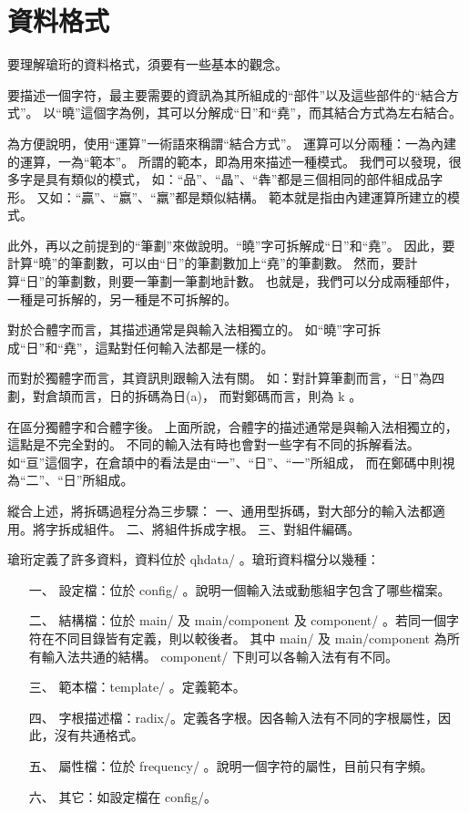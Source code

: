 ﻿\chapter{資料格式}

要理解瑲珩的資料格式，須要有一些基本的觀念。

要描述一個字符，最主要需要的資訊為其所組成的``部件''以及這些部件的``結合方式''。
以``曉''這個字為例，其可以分解成``日''和``堯''，而其結合方式為左右結合。

為方便說明，使用``運算''一術語來稱謂``結合方式''。
運算可以分兩種：一為內建的運算，一為``範本''。
所謂的範本，即為用來描述一種模式。
我們可以發現，很多字是具有類似的模式，
如：``品''、``晶''、``犇''都是三個相同的部件組成品字形。
又如：``贏''、``嬴''、``羸''都是類似結構。
範本就是指由內建運算所建立的模式。


此外，再以之前提到的``筆劃''來做說明。``曉''字可拆解成``日''和``堯''。
因此，要計算``曉''的筆劃數，可以由``日''的筆劃數加上``堯''的筆劃數。
然而，要計算``日''的筆劃數，則要一筆劃一筆劃地計數。
也就是，我們可以分成兩種部件，一種是可拆解的，另一種是不可拆解的。

對於合體字而言，其描述通常是與輸入法相獨立的。
如``曉''字可拆成``日''和``堯''，這點對任何輸入法都是一樣的。

而對於獨體字而言，其資訊則跟輸入法有關。
如：對計算筆劃而言，``日''為四劃，對倉頡而言，日的拆碼為日(a)，
而對鄭碼而言，則為 k 。

在區分獨體字和合體字後。
上面所說，合體字的描述通常是與輸入法相獨立的，這點是不完全對的。
不同的輸入法有時也會對一些字有不同的拆解看法。
如``亘''這個字，在倉頡中的看法是由``一''、``日''、``一''所組成，
而在鄭碼中則視為``二''、``日''所組成。

縱合上述，將拆碼過程分為三步驟：
一、通用型拆碼，對大部分的輸入法都適用。將字拆成組件。
二、將組件拆成字根。
三、對組件編碼。



瑲珩定義了許多資料，資料位於 qhdata/ 。瑲珩資料檔分以幾種：
\begin{enumerate}
\item[一、]設定檔：位於 config/ 。說明一個輸入法或動態組字包含了哪些檔案。
\item[二、]結構檔：位於 main/ 及 main/component 及 component/ 。若同一個字符在不同目錄皆有定義，則以較後者。
其中 main/ 及 main/component 為所有輸入法共通的結構。 component/ 下則可以各輸入法有有不同。
\item[三、]範本檔：template/ 。定義範本。
\item[四、]字根描述檔：radix/。定義各字根。因各輸入法有不同的字根屬性，因此，沒有共通格式。
\item[五、]屬性檔：位於 frequency/ 。說明一個字符的屬性，目前只有字頻。
\item[六、]其它：如設定檔在 config/。
\end{enumerate}


